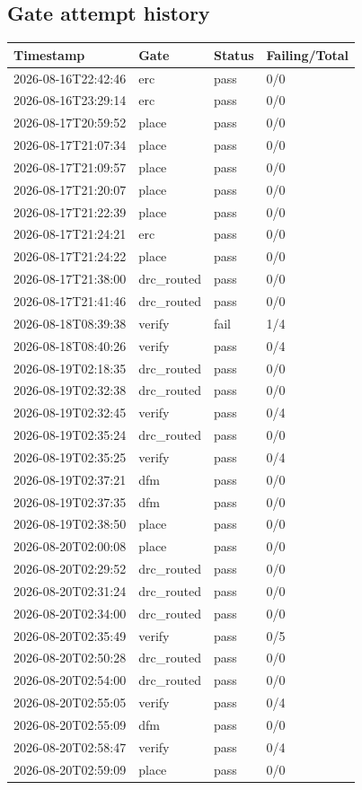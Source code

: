 \documentclass[11pt,a4paper]{article}
\begin{document}
\subsection*{Gate attempt history}
{\small
\begin{longtable}{llll}
\toprule
\textbf{Timestamp} & \textbf{Gate} & \textbf{Status} & \textbf{Failing/Total} \\
\midrule
\endhead
2026-08-16T22:42:46 & erc & pass & 0/0 \\
2026-08-16T23:29:14 & erc & pass & 0/0 \\
2026-08-17T20:59:52 & place & pass & 0/0 \\
2026-08-17T21:07:34 & place & pass & 0/0 \\
2026-08-17T21:09:57 & place & pass & 0/0 \\
2026-08-17T21:20:07 & place & pass & 0/0 \\
2026-08-17T21:22:39 & place & pass & 0/0 \\
2026-08-17T21:24:21 & erc & pass & 0/0 \\
2026-08-17T21:24:22 & place & pass & 0/0 \\
2026-08-17T21:38:00 & drc\_routed & pass & 0/0 \\
2026-08-17T21:41:46 & drc\_routed & pass & 0/0 \\
2026-08-18T08:39:38 & verify & fail & 1/4 \\
2026-08-18T08:40:26 & verify & pass & 0/4 \\
2026-08-19T02:18:35 & drc\_routed & pass & 0/0 \\
2026-08-19T02:32:38 & drc\_routed & pass & 0/0 \\
2026-08-19T02:32:45 & verify & pass & 0/4 \\
2026-08-19T02:35:24 & drc\_routed & pass & 0/0 \\
2026-08-19T02:35:25 & verify & pass & 0/4 \\
2026-08-19T02:37:21 & dfm & pass & 0/0 \\
2026-08-19T02:37:35 & dfm & pass & 0/0 \\
2026-08-19T02:38:50 & place & pass & 0/0 \\
2026-08-20T02:00:08 & place & pass & 0/0 \\
2026-08-20T02:29:52 & drc\_routed & pass & 0/0 \\
2026-08-20T02:31:24 & drc\_routed & pass & 0/0 \\
2026-08-20T02:34:00 & drc\_routed & pass & 0/0 \\
2026-08-20T02:35:49 & verify & pass & 0/5 \\
2026-08-20T02:50:28 & drc\_routed & pass & 0/0 \\
2026-08-20T02:54:00 & drc\_routed & pass & 0/0 \\
2026-08-20T02:55:05 & verify & pass & 0/4 \\
2026-08-20T02:55:09 & dfm & pass & 0/0 \\
2026-08-20T02:58:47 & verify & pass & 0/4 \\
2026-08-20T02:59:09 & place & pass & 0/0 \\
\bottomrule
\end{longtable}
}
\end{document}
